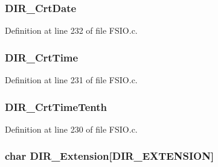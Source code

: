 \subsubsection[{D\+I\+R\+\_\+\+Crt\+Date}]{ D\+I\+R\+\_\+\+Crt\+Date}\label{struct___d_i_r_e_n_t_r_y_a0c839078c5efd521c5932fc5265e801f}


Definition at line 232 of file F\+S\+I\+O.\+c.

\hypertarget{struct___d_i_r_e_n_t_r_y_ae81c6adf07fde67ea9c31e4ca904fe9c}{}
\subsubsection[{D\+I\+R\+\_\+\+Crt\+Time}]{ D\+I\+R\+\_\+\+Crt\+Time}\label{struct___d_i_r_e_n_t_r_y_ae81c6adf07fde67ea9c31e4ca904fe9c}


Definition at line 231 of file F\+S\+I\+O.\+c.

\hypertarget{struct___d_i_r_e_n_t_r_y_a2dbef950992bb9e3796112b2fc442365}{}
\subsubsection[{D\+I\+R\+\_\+\+Crt\+Time\+Tenth}]{ D\+I\+R\+\_\+\+Crt\+Time\+Tenth}\label{struct___d_i_r_e_n_t_r_y_a2dbef950992bb9e3796112b2fc442365}


Definition at line 230 of file F\+S\+I\+O.\+c.

\hypertarget{struct___d_i_r_e_n_t_r_y_a50e85f8c7004ed15f0f126c62e9947b1}{}
\subsubsection[{D\+I\+R\+\_\+\+Extension}]{\setlength{\rightskip}{0pt plus 5cm}char D\+I\+R\+\_\+\+Extension\mbox{[}{\bf D\+I\+R\+\_\+\+E\+X\+T\+E\+N\+S\+I\+O\+N}\mbox{]}}\label{struct___d_i_r_e_n_t_r_y_a50e85f8c7004ed15f0f126c62e9947b1}


